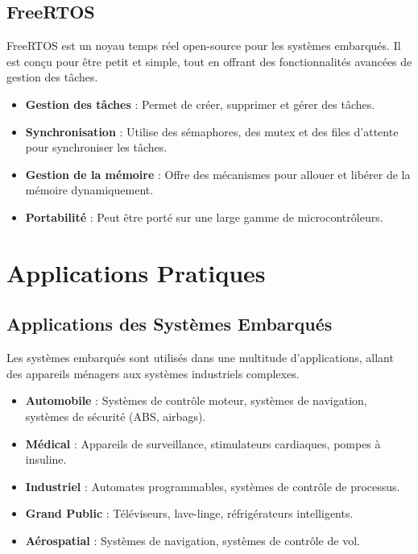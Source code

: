 \documentclass[10pt,a4paper]{article}
\begin{document}

\subsection*{FreeRTOS}

FreeRTOS est un noyau temps réel open-source pour les systèmes embarqués. Il est conçu pour être petit et simple, tout en offrant des fonctionnalités avancées de gestion des tâches.

\begin{itemize}
    \item \textbf{Gestion des tâches} : Permet de créer, supprimer et gérer des tâches.
    \item \textbf{Synchronisation} : Utilise des sémaphores, des mutex et des files d'attente pour synchroniser les tâches.
    \item \textbf{Gestion de la mémoire} : Offre des mécanismes pour allouer et libérer de la mémoire dynamiquement.
    \item \textbf{Portabilité} : Peut être porté sur une large gamme de microcontrôleurs.
\end{itemize}


\section*{Applications Pratiques}

\subsection*{Applications des Systèmes Embarqués}

Les systèmes embarqués sont utilisés dans une multitude d'applications, allant des appareils ménagers aux systèmes industriels complexes.

\begin{itemize}
    \item \textbf{Automobile} : Systèmes de contrôle moteur, systèmes de navigation, systèmes de sécurité (ABS, airbags).
    \item \textbf{Médical} : Appareils de surveillance, stimulateurs cardiaques, pompes à insuline.
    \item \textbf{Industriel} : Automates programmables, systèmes de contrôle de processus.
    \item \textbf{Grand Public} : Téléviseurs, lave-linge, réfrigérateurs intelligents.
    \item \textbf{Aérospatial} : Systèmes de navigation, systèmes de contrôle de vol.
\end{itemize}
\end{document}
